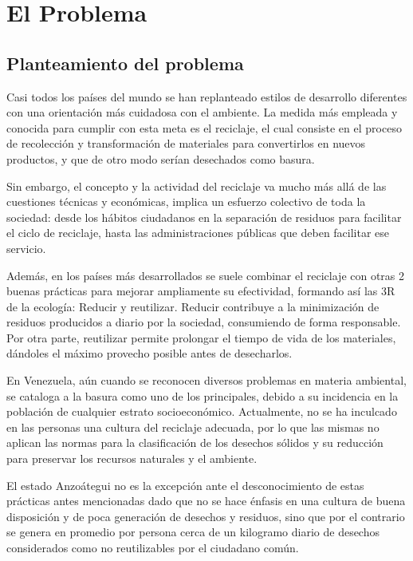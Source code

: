 \vspace*{6cm}
\chapter{El Problema}
\newpage

\section{Planteamiento del problema}

Casi todos los países del mundo se han replanteado estilos de desarrollo diferentes con una orientación más cuidadosa con el ambiente. La medida más empleada y conocida para cumplir con esta meta es el reciclaje, el cual consiste en el proceso de recolección y transformación de materiales para convertirlos en nuevos productos, y que de otro modo serían desechados como basura.

Sin embargo, el concepto y la actividad del reciclaje va mucho más allá de las cuestiones técnicas y económicas, implica un esfuerzo colectivo de toda la sociedad: desde los hábitos ciudadanos en la separación de residuos para facilitar el ciclo de reciclaje, hasta las administraciones públicas que deben facilitar ese servicio. 

Además, en los países más desarrollados se suele combinar el reciclaje con otras 2 buenas prácticas para mejorar ampliamente su efectividad, formando así las 3R de la ecología: Reducir y reutilizar. Reducir contribuye a la minimización de residuos producidos a diario por la sociedad, consumiendo de forma responsable. Por otra parte, reutilizar permite prolongar el tiempo de vida de los materiales, dándoles el máximo provecho posible antes de desecharlos.

En Venezuela, aún cuando se reconocen diversos problemas en materia ambiental, se cataloga a la basura como uno de los principales, debido a su incidencia en la población de cualquier estrato socioeconómico. Actualmente, no se ha inculcado en las personas una cultura del reciclaje adecuada, por lo que las mismas no aplican las normas para la clasificación de los desechos sólidos y su reducción para preservar los recursos naturales y el ambiente.

El estado Anzoátegui no es la excepción ante el desconocimiento de estas prácticas antes mencionadas dado que no se hace énfasis en una cultura de buena disposición y de poca generación de desechos y residuos, sino que por el contrario se genera en promedio por persona cerca de un kilogramo diario de desechos considerados como no reutilizables por el ciudadano común.

